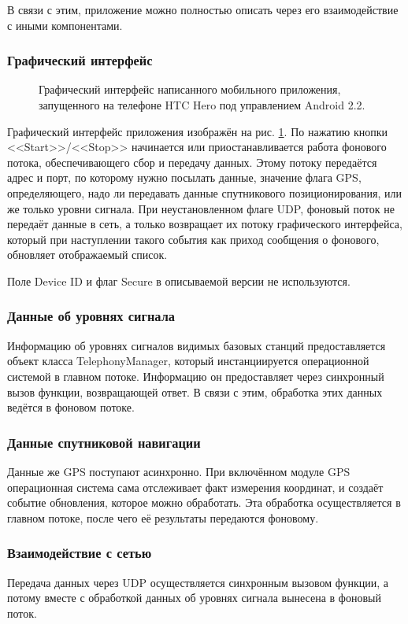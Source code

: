 В связи с этим, приложение можно полностью описать через его взаимодействие с иными компонентами.

\subsubsection{Графический интерфейс}
\begin{figure}[h]
	\caption{Графический интерфейс написанного мобильного приложения, запущенного на телефоне HTC Hero под управлением Android 2.2.}
	\label{fig:tatmon-android}
\end{figure}
Графический интерфейс приложения изображён на рис. \ref{fig:tatmon-android}.
По нажатию кнопки <<Start>>/<<Stop>> начинается или приостанавливается работа фонового потока, обеспечивающего сбор и передачу данных. Этому потоку передаётся адрес и порт, по которому нужно посылать данные, значение флага GPS, определяющего, надо ли передавать данные спутникового позиционирования, или же только уровни сигнала. При неустановленном флаге UDP, фоновый поток не передаёт данные в сеть, а только возвращает их потоку графического интерфейса, который при наступлении такого события как приход сообщения о фонового, обновляет отображаемый список.

Поле Device ID и флаг Secure в описываемой версии не используются.

\subsubsection{Данные об уровнях сигнала}
Информацию об уровнях сигналов видимых базовых станций предоставляется объект класса TelephonyManager, который инстанциируется операционной системой в главном потоке. Информацию он предоставляет через синхронный вызов функции, возвращающей ответ. В связи с этим, обработка этих данных ведётся в фоновом потоке.

\subsubsection{Данные спутниковой навигации}
Данные же GPS поступают асинхронно. При включённом модуле GPS операционная система сама отслеживает факт измерения координат, и создаёт событие обновления, которое можно обработать. Эта обработка осуществляется в главном потоке, после чего её результаты передаются фоновому.

\subsubsection{Взаимодействие с сетью}
Передача данных через UDP осуществляется синхронным вызовом функции, а потому вместе с обработкой данных об уровнях сигнала вынесена в фоновый поток.

